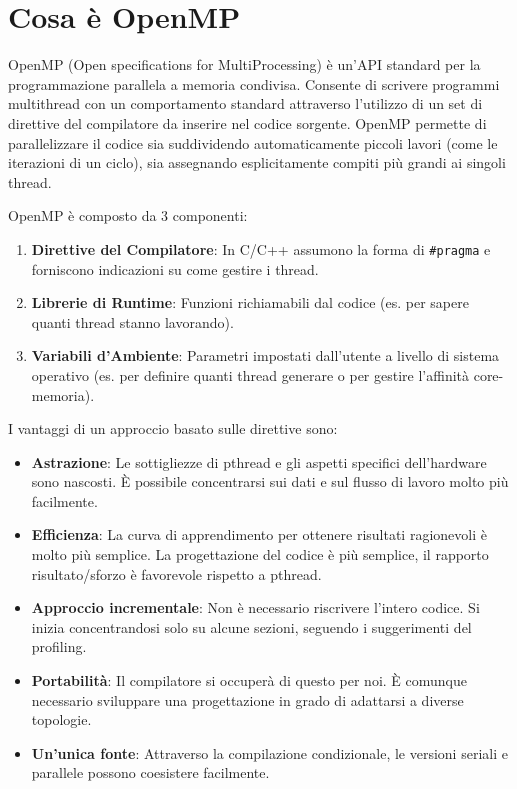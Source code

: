 \section{Cosa è OpenMP}
OpenMP (Open specifications for MultiProcessing) è un'API standard per la programmazione parallela a memoria condivisa. 
Consente di scrivere programmi multithread con un comportamento standard attraverso l'utilizzo di un set di direttive del compilatore da inserire nel codice sorgente. OpenMP permette di parallelizzare il codice sia suddividendo automaticamente piccoli lavori (come le iterazioni di un ciclo), sia assegnando esplicitamente compiti più grandi ai singoli thread.

\noindent
OpenMP è composto da 3 componenti:
\begin{enumerate}
    \item \textbf{Direttive del Compilatore}: In C/C++ assumono la forma di \texttt{\#pragma} e forniscono indicazioni su come gestire i thread.
    \item \textbf{Librerie di Runtime}: Funzioni richiamabili dal codice (es. per sapere quanti thread stanno lavorando).
    \item \textbf{Variabili d'Ambiente}: Parametri impostati dall'utente a livello di sistema operativo (es. per definire quanti thread generare o per gestire l'affinità core-memoria).
\end{enumerate}

I vantaggi di un approccio basato sulle direttive sono:

\begin{itemize}
    \item \textbf{Astrazione}: Le sottigliezze di pthread e gli aspetti specifici dell'hardware sono nascosti. È possibile concentrarsi sui dati e sul flusso di lavoro molto più facilmente.
    \item \textbf{Efficienza}: La curva di apprendimento per ottenere risultati ragionevoli è molto più semplice. La progettazione del codice è più semplice, il rapporto risultato/sforzo è favorevole rispetto a pthread.
    \item \textbf{Approccio incrementale}: Non è necessario riscrivere l'intero codice. Si inizia concentrandosi solo su alcune sezioni, seguendo i suggerimenti del profiling.
    \item \textbf{Portabilità}: Il compilatore si occuperà di questo per noi. È comunque necessario sviluppare una progettazione in grado di adattarsi a diverse topologie.
    \item \textbf{Un'unica fonte}: Attraverso la compilazione condizionale, le versioni seriali e parallele possono coesistere facilmente.
\end{itemize}

